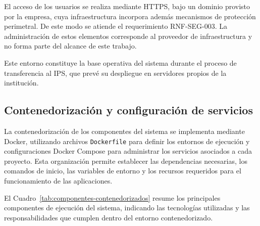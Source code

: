 El acceso de los usuarios se realiza mediante HTTPS, bajo un dominio provisto por la empresa, cuya infraestructura incorpora además mecanismos de protección perimetral.
De este modo se atiende el requerimiento RNF-SEG-003.
La administración de estos elementos corresponde al proveedor de infraestructura y no forma parte del alcance de este trabajo.

Este entorno constituye la base operativa del sistema durante el proceso de transferencia al IPS, que prevé su despliegue en servidores propios de la institución.

\subsection{Contenedorización y configuración de servicios}

La contenedorización de los componentes del sistema se implementa
mediante Docker, utilizando archivos \texttt{Dockerfile} para definir los
entornos de ejecución y configuraciones Docker Compose para
administrar los servicios asociados a cada proyecto. Esta
organización permite establecer las dependencias necesarias,
los comandos de inicio, las variables de entorno y los recursos
requeridos para el funcionamiento de las aplicaciones.

El Cuadro~\ref{tab:componentes-contenedorizados} resume los
principales componentes de ejecución del sistema, indicando
las tecnologías utilizadas y las responsabilidades que
cumplen dentro del entorno contenedorizado.

